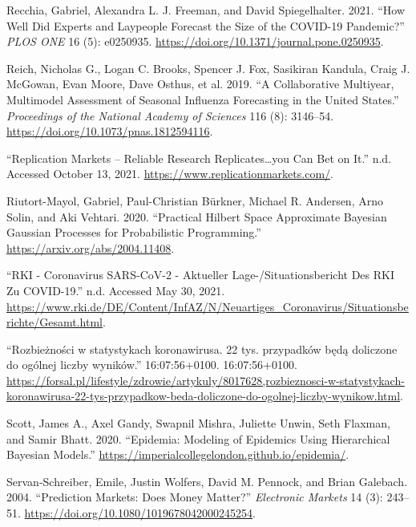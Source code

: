 \documentclass[
]{article}
\newlength{\cslhangindent}
\newlength{\cslentryspacingunit} %
\newenvironment{CSLReferences}[2] %
 {%
  \setlength{\parindent}{0pt}
  \ifodd #1
  \let\oldpar\par
  \def\par{\hangindent=\cslhangindent\oldpar}
  \fi
  \setlength{\parskip}{#2\cslentryspacingunit}
 }%
 {}
\begin{document}
\begin{CSLReferences}{1}{0}
\leavevmode{}%
Recchia, Gabriel, Alexandra L. J. Freeman, and David Spiegelhalter. 2021. {``How Well Did Experts and Laypeople Forecast the Size of the {COVID}-19 Pandemic?''} \emph{PLOS ONE} 16 (5): e0250935. \url{https://doi.org/10.1371/journal.pone.0250935}.

\leavevmode{}%
Reich, Nicholas G., Logan C. Brooks, Spencer J. Fox, Sasikiran Kandula, Craig J. McGowan, Evan Moore, Dave Osthus, et al. 2019. {``A Collaborative Multiyear, Multimodel Assessment of Seasonal Influenza Forecasting in the {United States}.''} \emph{Proceedings of the National Academy of Sciences} 116 (8): 3146--54. \url{https://doi.org/10.1073/pnas.1812594116}.

\leavevmode{}%
{``Replication {Markets} -- {Reliable} Research Replicates\ldots you Can Bet on It.''} n.d. Accessed October 13, 2021. \url{https://www.replicationmarkets.com/}.

\leavevmode{}%
Riutort-Mayol, Gabriel, Paul-Christian Bürkner, Michael R. Andersen, Arno Solin, and Aki Vehtari. 2020. {``Practical Hilbert Space Approximate Bayesian Gaussian Processes for Probabilistic Programming.''} \url{https://arxiv.org/abs/2004.11408}.

\leavevmode{}%
{``{RKI} - {Coronavirus SARS}-{CoV}-2 - {Aktueller Lage}-/{Situationsbericht} Des {RKI} Zu {COVID}-19.''} n.d. Accessed May 30, 2021. \url{https://www.rki.de/DE/Content/InfAZ/N/Neuartiges_Coronavirus/Situationsberichte/Gesamt.html}.

\leavevmode{}%
{``Rozbieżności w statystykach koronawirusa. 22 tys. przypadków będą doliczone do ogólnej liczby wyników.''} 16:07:56+0100. 16:07:56+0100. \url{https://forsal.pl/lifestyle/zdrowie/artykuly/8017628,rozbieznosci-w-statystykach-koronawirusa-22-tys-przypadkow-beda-doliczone-do-ogolnej-liczby-wynikow.html}.

\leavevmode{}%
Scott, James A., Axel Gandy, Swapnil Mishra, Juliette Unwin, Seth Flaxman, and Samir Bhatt. 2020. {``Epidemia: Modeling of Epidemics Using Hierarchical Bayesian Models.''} \url{https://imperialcollegelondon.github.io/epidemia/}.

\leavevmode{}%
Servan-Schreiber, Emile, Justin Wolfers, David M. Pennock, and Brian Galebach. 2004. {``Prediction {Markets}: Does {Money Matter}?''} \emph{Electronic Markets} 14 (3): 243--51. \url{https://doi.org/10.1080/1019678042000245254}.


\end{CSLReferences}
\end{document}
